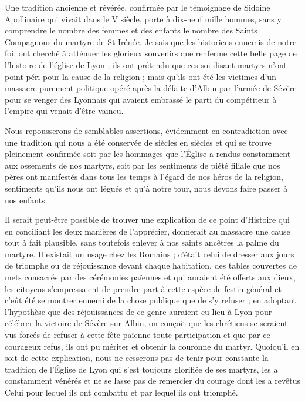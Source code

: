 \documentclass[11pt,a4paper]{report}
\begin{document}
Une tradition ancienne et révérée, confirmée par le témoignage de Sidoine Apollinaire qui vivait dans le V siècle, porte à dix-neuf mille hommes, sans y comprendre le nombre des femmes et des enfants le nombre des Saints Compagnons du martyre de St Irénée. Je sais que les historiens ennemis de notre foi, ont cherché à atténuer les glorieux souvenirs que renferme cette belle page de l'histoire de l'église de Lyon ; ils ont prétendu que ces soi-disant martyrs n'ont point péri pour la cause de la religion ; mais qu'ils ont été les victimes d'un massacre purement politique opéré après la défaite d'Albin par l'armée de Sévère pour se venger des Lyonnais qui avaient embrassé le parti du compétiteur à l'empire qui venait d'être vaincu.

Nous repousserons de semblables assertions, évidemment en contradiction avec une tradition qui nous a été conservée de siècles en siècles et qui se trouve pleinement confirmée soit par les hommages que l'Église a rendus constamment aux ossements de nos martyrs, soit par les sentiments de piété filiale que nos pères ont manifestés dans tous les temps à l'égard de nos héros de la religion, sentiments qu'ils nous ont légués et qu'à notre tour, nous devons faire passer à nos enfants.

Il serait peut-être possible de trouver une explication de ce point d'Histoire qui en conciliant les deux manières de l'apprécier, donnerait au massacre une cause tout à fait plausible, sans toutefois enlever à nos saints ancêtres la palme du martyre. Il existait un usage chez les Romains ; c'était celui de dresser aux jours de triomphe ou de réjouissance devant chaque habitation, des tables couvertes de mets consacrés par des cérémonies païennes et qui auraient été offerts aux dieux, les citoyens s'empressaient de prendre part à cette espèce de festin général et c'eût été se montrer ennemi de la chose publique que de s'y refuser ; en adoptant l'hypothèse que des réjouissances de ce genre auraient eu lieu à Lyon pour célébrer la victoire de Sévère sur Albin, on conçoit que les chrétiens se seraient vus forcés de refuser à cette fête païenne toute participation et que par ce courageux refus, ils ont pu mériter et obtenir la couronne du martyr. Quoiqu'il en soit de cette explication, nous ne cesserons pas de tenir pour constante la tradition de l'Église de Lyon qui s'est toujours glorifiée de ses martyrs, les a constamment vénérés et ne se lasse pas de remercier du courage dont les a revêtus Celui pour lequel ils ont combattu et par lequel ils ont triomphé.
\end{document}
